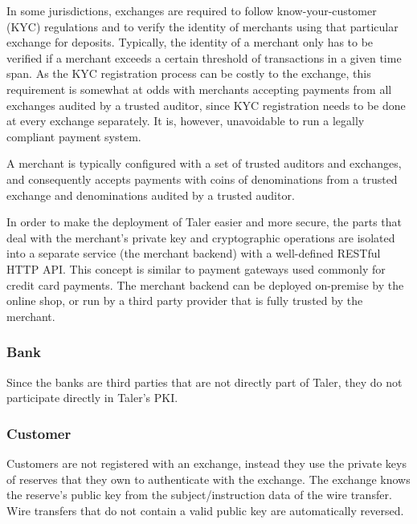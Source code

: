 In some jurisdictions, exchanges are required to follow know-your-customer
(KYC) regulations and to verify the identity of merchants \cite{arner2018identity} using that particular
exchange for deposits.  Typically, the identity of a merchant only has to be
verified if a merchant exceeds a certain threshold of transactions in a given
time span.  As the KYC registration process can be costly to the exchange, this
requirement is somewhat at odds with merchants accepting payments from all
exchanges audited by a trusted auditor, since KYC registration needs to be done
at every exchange separately.  It is, however, unavoidable to run a legally
compliant payment system.

A merchant is typically configured with a set of trusted auditors and
exchanges, and consequently accepts payments with coins of denominations from a
trusted exchange and denominations audited by a trusted auditor.

In order to make the deployment of Taler easier and more secure, the parts that
deal with the merchant's private key and cryptographic operations are isolated
into a separate service (the merchant backend) with a well-defined RESTful HTTP API.
This concept is similar to payment gateways used commonly for credit card
payments.  The merchant backend can be deployed on-premise by the online shop,
or run by a third party provider that is fully trusted by the merchant.

\subsubsection{Bank}
Since the banks are third parties that are not directly part of Taler, they do
not participate directly in Taler's PKI.

\subsubsection{Customer}
Customers are not registered with an exchange, instead they use the private
keys of reserves that they own to authenticate with the exchange.  The exchange
knows the reserve's public key from the subject/instruction data of the wire
transfer.  Wire transfers that do not contain a valid public key are
automatically reversed.


